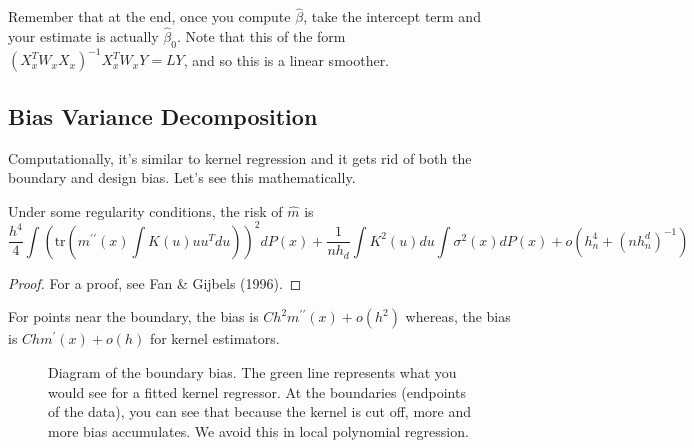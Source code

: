   Remember that at the end, once you compute $\hat{\beta}$, take the intercept term and your estimate is actually $\hat{\beta}_0$. Note that this of the form $(X_x^T W_x X_x)^{-1} X_x^T W_x Y = LY$, and so this is a linear smoother. 

\subsection{Bias Variance Decomposition}

  Computationally, it's similar to kernel regression and it gets rid of both the boundary and design bias. Let's see this mathematically. 

  \begin{theorem}
    Under some regularity conditions, the risk of $\hat{m}$ is
    \begin{equation}
      \frac{h^4}{4} \int \left( \text{tr}(m^{\prime\prime}(x) \int K(u)uu^T du) \right)^2 dP(x) + \frac{1}{nh_d} \int K^2(u)du \int \sigma^2(x)dP(x) + o(h_n^4 + (nh_n^d)^{-1})
    \end{equation}
  \end{theorem}
  \begin{proof}
    For a proof, see Fan \& Gijbels (1996). 
  \end{proof}

  For points near the boundary, the bias is $Ch^2m^{\prime\prime}(x) + o(h^2)$ whereas, the bias is $Chm^{\prime}(x) + o(h)$ for kernel estimators.

  \begin{figure}[H]
    \centering 
    \caption{Diagram of the boundary bias. The green line represents what you would see for a fitted kernel regressor. At the boundaries (endpoints of the data), you can see that because the kernel is cut off, more and more bias accumulates. We avoid this in local polynomial regression.} 
  \end{figure}

